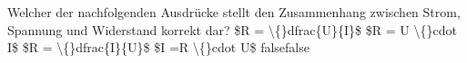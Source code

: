     {Welcher der nachfolgenden Ausdrücke stellt den Zusammenhang zwischen Strom, Spannung und Widerstand korrekt dar?}
    {\$R = \textbackslash\{\}dfrac\{U\}\{I\}\$}
    {\$R = U \textbackslash\{\}cdot I\$}
    {\$R = \textbackslash\{\}dfrac\{I\}\{U\}\$}
    {\$I =R \textbackslash\{\}cdot U\$}
    {false}{false}